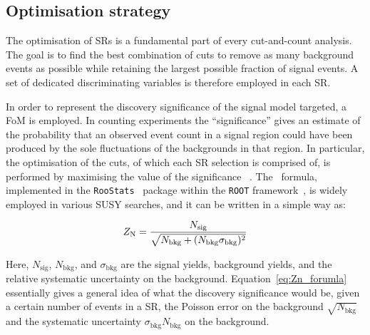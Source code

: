 		\subsection{Optimisation strategy}

			The optimisation of \acp{SR} is a fundamental part of every cut-and-count analysis. The goal is to find the best combination of cuts to remove as many background events as possible while retaining the largest possible fraction of signal events. A set of dedicated discriminating variables is therefore employed in each \ac{SR}.

			In order to represent the discovery significance of the signal model targeted, a \ac{FoM} is employed. In counting experiments the ``significance'' gives an estimate of the probability that an observed event count in a signal region could have been produced by the sole fluctuations of the backgrounds in that region. In particular, the optimisation of the cuts, of which each \ac{SR} selection is comprised of, is performed by maximising the value of the significance \Zn~\cite{Zn}. The \Zn\ formula, implemented in the \verb+RooStats+~\cite{2010acat.confE..57M} package within the \verb+ROOT+ framework~\cite{Brun:1997pa}, is widely employed in various \ac{SUSY} searches, and it can be written in a simple way as: 

			\begin{equation}
				Z_\mathrm{N} = \frac{N_\mathrm{sig}}{\sqrt{ N_\mathrm{bkg} + (N_\mathrm{bkg}\sigma_\mathrm{bkg})^2}}
				\label{eq:Zn_forumla}
			\end{equation} 

			\noindent Here, $N_\mathrm{sig}$, $N_\mathrm{bkg}$, and $\sigma_\mathrm{bkg}$ are the signal yields, background yields, and the relative systematic uncertainty on the background.%
			Equation~\ref{eq:Zn_forumla} essentially gives a general idea of what the discovery significance would be, given a certain number of events in a \ac{SR}, the Poisson error on the background $\sqrt{N_{\mathrm{bkg}}}$ and the systematic uncertainty $\sigma_{\mathrm{bkg}} N_{\mathrm{bkg}}$ on the background. %


